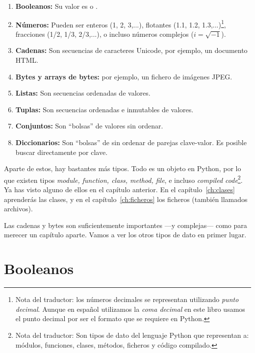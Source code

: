 \begin{enumerate}

\item \textbf{Booleanos:} Su valor es  o .

\item \textbf{Números:} Pueden ser enteros (1, 2, 3,...), flotantes (1.1, 1.2, 1.3,...)\footnote{Nota del traductor: los números decimales se representan utilizando \emph{punto decimal}. Aunque en español utilizamos la \emph{coma decimal} en este libro usamos el punto decimal por ser el formato que se requiere en Python.}, fracciones (1/2, 1/3, 2/3,...), o incluso números complejos ($i = \sqrt{-1}$).

\item \textbf{Cadenas:} Son secuencias de caracteres Unicode, por ejemplo, un documento HTML.

\item \textbf{Bytes y arrays de bytes:} por ejemplo, un fichero de imágenes JPEG.

\item \textbf{Listas:} Son secuencias ordenadas de valores.

\item \textbf{Tuplas:} Son secuencias ordenadas e inmutables de valores.

\item \textbf{Conjuntos:} Son ``bolsas'' de valores sin ordenar.

\item \textbf{Diccionarios:} Son ``bolsas'' de sin ordenar de parejas clave-valor. Es posible buscar directamente por clave.

\end{enumerate}

Aparte de estos, hay bastantes más tipos. Todo es un objeto en Python, por lo que existen tipos \emph{module, function, class, method, file}, e incluso \emph{compiled code}\footnote{Nota del traductor: Son tipos de dato del lenguaje Python que representan a: módulos, funciones, clases, métodos, ficheros y código compilado.}. Ya has visto alguno de ellos en el capítulo anterior. En el capítulo~\ref{ch:clases} aprenderás las clases, y en el capítulo~\ref{ch:ficheros} los ficheros (también llamados archivos).

Las cadenas y bytes son suficientemente importantes ---y complejas--- como para merecer un capítulo aparte. Vamos a ver los otros tipos de dato en primer lugar.

\section{Booleanos}

